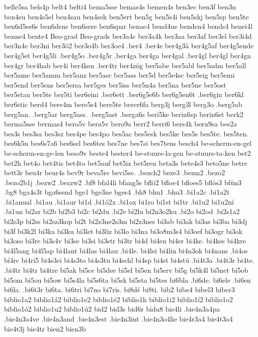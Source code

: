 belle5sa
bels4p
belt4
belti4
bema5sse
bemas4s
bemen4s
ben3ec
ben3f
ben3n
ben4eu
ben4s5el
ben4sau
ben4sek
ben5ert
ben5g
ben5s4i
ben5skj
ben5sp
ben5te
ben6d5es6s
ben6dens
ben6sere
ben6spar
benae4
bend4ue
benden4
bends4
benei4l
benne4
bente4
Beo-grad
Beo-grads
ber3a4c
ber3a4k
ber3aa
ber3af
ber3el
ber3i4d
ber3n4e
ber3ni
ber3ö2
ber3o4b
ber3oe4
.ber4
.ber4e
ber4g3å
ber4g5af
ber4g5ende
ber4g5et
ber4g5li
.ber4g5o
.ber4g5r
.ber4ga
ber4ga
ber4gal
.ber4gl
ber4gl
ber4gn
ber4gr
ber4hab
ber4i
ber4ken
.ber4tr
ber4zög
ber5abe
ber5abl
ber5adm
ber5all
ber5ame
ber5amm
ber5anz
ber5asc
ber5ass
ber5d
ber5e4sc
ber5eig
ber5emi
ber5end
ber5ens
ber5ersa
ber5ges
ber5iss
ber5n4a
ber5na
ber5ne
ber5ost
ber5stau
ber5te
ber5ti
ber6eini
.ber6ett
.ber6g5e6b
ber6g5en6t
.ber6gin
ber6kl
ber6stic
berd4
bere4m
bere5s4
bere5te
berer6fa
berg3j
berg3l
berg3o
.berg5ab
berg5an.
.berg5ar
berg5ass.
.berg5ast
.berga6s
beri5ke
berin6sp
berin6st
berk2
berma5sse
bermas4
bero5v
berø5v
bero9a
berr2
berri6
bers4k
beru9sa
bes2a
bes3s
bes3sa
bes3sz
bes4pe
bes4po
bes5ac
bes5esk
bes5ke
bes5s
bes5te.
bes5ten.
bes6k5n
bes6s7a6
bes6sel
bes6tes
bes7ne
bes7si
bes7tens
besch4
be-scherm-en-gel
be-scherm-en-ge-len
beso9v
beste4
bester4
be-stuurs-la-gen
be-stuurs-ta-ken
bet2
bet2h
bet4o
bet4tis
bet4to
bet5auf
bet5iz
bet5ren
beta3s
bete4s3
beto5ne
betre
bett3r
beu4r
beur4s
bev9r
beva5re
bevi5se.
.bezch2
beze3
.bezm2
.bezo2
.bezo2b1j
.bezw2
.bezzw2
.bf8
bfal4li
bfang5s
bflö2
bfloe4
bfloes5
bflös3
bfün3
.bg8
bga4s3t
bga6send
bge1
bge3ne
bges4
.bh8
bhu1
.bhu3
.bi1a2c
.bi1a2t
.bi1anual
.bi1au
.bi1aur
bi1d
.bi1ó2x
.bi1ox
bi1ro
bi1st
bi1tr
.bi1u2
bi1u2ní
.bi1un
bi2ar
bi2b
bi2b3
bi2c
bi2du
.bi2e
bi2lu
bi2n3o2ku
.bi2o
bi2od
.bi2s1a2
bi2s3p
bi2ss
bi2sz3kop
bi2t
bi2z3ne2s3m
bi2z3nes
bi3ab
bi3ak
bi3as
bi3ba
bi3dj
bi3f
bi3k2l
bi3ka
bi3ku
bi3let
bi3liz
bi3lo
bi3na
bi3o8m3s4
bi3oef
bi3ogr
bi3ok
bi3oso
bi3re
bi3s4v
bi3se
bi3si
bi3str
bi3tr
bi4d
bi4en
bi4er
bi4ke.
bi4kes
bi4kre
bi4l5ang
bi4l5ap
bi4lant
bi4las
bi4lau
.bi4le.
bi4lei
bi4lin
bi4n3ok
bi4nans
.bi4os
bí4rc
bi4ri5
bi4s3ei
bi4s3to
bi4s3tu
bi4schl
bi4sp
bi4st
bi4stü
.bi4t3a
.bi4t3r
bi4te.
.bi4tr
bi4tr
bi4tre
bi5ak
bi5ce
bi5dee
bi5el
bi5en
bi5erv
bi5g
bi5k4l
bi5net
bi5ob
bi5om
bi5ou
bi5ow
bi5s4la
bi5s6ta
bi5sk
bi5sta
bi5tes
bi6bla
.bi6de.
bi6ele
.bi6en
bi6la.
.bi6t3r
bi6ta.
bi6tri
bi7no
bi7ris.
bi8dé
bi8ti.
bib2
bibe4
bibel3
biber3
biblio1a2
biblio1á2
biblio1e2
biblio1é2
biblio1h
biblio1i2
biblio1í2
biblio1o2
biblio1ó2
biblio1u2
biblio1ú2
bid2
bid3s
bid6r
bidu8
bie4li
.bie4n3a4pa
.bie4n3a4ve
.bie4n3and
.bie4n3est
.bie4n3int
.bie4n3o4lie
bie4r3a4
bie4t3a4
bie4t3j
bie4tr
bien2
bien3b
